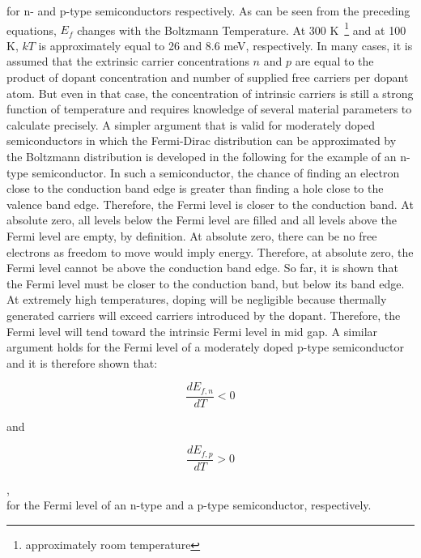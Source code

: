 for n- and p-type semiconductors respectively. As can be seen from the preceding equations, $E_{f}$ changes with the Boltzmann Temperature. At 300 K~\footnote{approximately room temperature} and at 100 K, $kT$ is approximately equal to 26 and 8.6 meV, respectively. In many cases, it is assumed that the extrinsic carrier concentrations $n$ and $p$ are equal to the product of dopant concentration and number of supplied free carriers per dopant atom. But even in that case, the concentration of intrinsic carriers is still a strong function of temperature and requires knowledge of several material parameters to calculate precisely. A simpler argument that is valid for moderately doped semiconductors in which the Fermi-Dirac distribution can be approximated by the Boltzmann distribution is developed in the following for the example of an n-type semiconductor. In such a semiconductor, the chance of finding an electron close to the conduction band edge is greater than finding a hole close to the valence band edge. Therefore, the Fermi level is closer to the conduction band. At absolute zero, all levels below the Fermi level are filled and all levels above the Fermi level are empty, by definition. At absolute zero, there can be no free electrons as freedom to move would imply energy. Therefore, at absolute zero, the Fermi level cannot be above the conduction band edge. So far, it is shown that the Fermi level must be closer to the conduction band, but below its band edge. At extremely high temperatures, doping will be negligible because thermally generated carriers will exceed carriers introduced by the dopant. Therefore, the Fermi level will tend toward the intrinsic Fermi level in mid gap. A similar argument holds for the Fermi level of a moderately doped p-type semiconductor and it is therefore shown that:\\[5pt]
\begin{minipage}[c]{0.4\textwidth}
	\begin{equation}
	\frac{dE_{f,n}}{dT} < 0
	\end{equation}
\end{minipage}	
\hfill
and
\hfill
\begin{minipage}[c]{0.4\textwidth}
	\begin{equation}
	\frac{dE_{f,p}}{dT} > 0
	\end{equation}
\end{minipage},\\[10pt]
for the Fermi level of an n-type and a p-type semiconductor, respectively.
